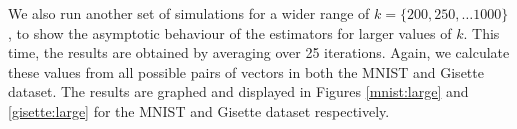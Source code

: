 \documentclass[runningheads]{llncs}
\begin{document}
    
    We also run another set of simulations for a wider range of $k = \{200, 250, \dots 1000\}$, to show the asymptotic behaviour of the estimators for larger values of $k$. This time, the results are obtained by averaging over 25 iterations. Again, we calculate these values from all possible pairs of vectors in both the MNIST and Gisette dataset. The results are graphed and displayed in Figures \ref{mnist:large} and \ref{gisette:large} for the MNIST and Gisette dataset respectively.
\end{document}
